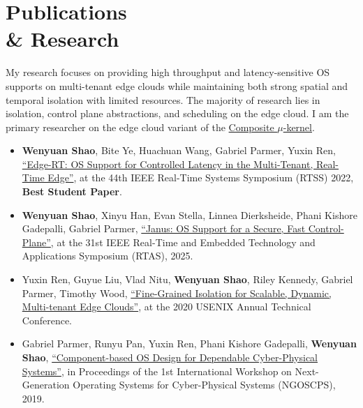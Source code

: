 \section{Publications\\ \& Research}
{\hspace*{1.7em} My research focuses on providing high throughput and latency-sensitive OS supports on multi-tenant edge clouds while maintaining both strong spatial and temporal isolation with limited resources.
The majority of research lies in isolation, control plane abstractions, and scheduling on the edge cloud.
I am the primary researcher on the edge cloud variant of the \href{https://composite.seas.gwu.edu/}{Composite $\mu$-kernel}.}

\vspace{0.2em}
\begin{itemize}[leftmargin=*]
  \setlength\itemsep{-0.0em}
  \item \textbf{Wenyuan Shao}, Bite Ye, Huachuan Wang, Gabriel Parmer, Yuxin Ren, \href{https://www2.seas.gwu.edu/~gparmer/publications/rtss22edgert.pdf}{\enquote{Edge-RT: OS Support for Controlled Latency in the Multi-Tenant, Real-Time Edge}}, at the 44th IEEE Real-Time Systems Symposium (RTSS) 2022, \textbf{Best Student Paper}.
  \item \textbf{Wenyuan Shao}, Xinyu Han, Evan Stella, Linnea Dierksheide, Phani Kishore Gadepalli, Gabriel Parmer, \href{https://faculty.cs.gwu.edu/gparmer/publications/rtas25janus.pdf}{\enquote{Janus: OS Support for a Secure, Fast Control-Plane}}, at the 31st IEEE Real-Time and Embedded Technology and Applications Symposium (RTAS), 2025.
  \item Yuxin Ren, Guyue Liu, Vlad Nitu, \textbf{Wenyuan Shao}, Riley Kennedy, Gabriel Parmer, Timothy Wood, \href{https://www.usenix.org/system/files/atc20-ren.pdf}{\enquote{Fine-Grained Isolation for Scalable, Dynamic, Multi-tenant Edge Clouds}}, at the 2020 USENIX Annual Technical Conference.
  \item Gabriel Parmer, Runyu Pan, Yuxin Ren, Phani Kishore Gadepalli, \textbf{Wenyuan Shao}, \href{https://www2.seas.gwu.edu/~gparmer/publications/ngoscps_19.pdf}{\enquote{Component-based OS Design for Dependable Cyber-Physical Systems}}, in Proceedings of the 1st International Workshop on Next-Generation Operating Systems for Cyber-Physical Systems (NGOSCPS), 2019.
\end{itemize} 

